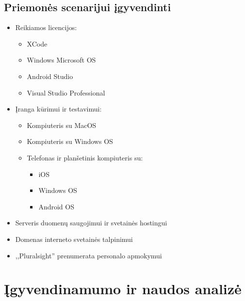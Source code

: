\documentclass{VUMIFPSkursinis}
\begin{document}
    \subsection{Priemonės scenarijui įgyvendinti} \label{sistemosNaudojimoScenarijus_esamaBukle_priemonesScenarijuiIgyvendinti}
      \begin{itemize}
        \item Reikiamos licencijos:
          \begin{itemize}
            \item XCode
            \item Windows Microsoft OS
            \item Android Studio
            \item Visual Studio Professional
          \end{itemize}
        \item Įranga kūrimui ir testavimui:
          \begin{itemize}
            \item Kompiuteris su MacOS
            \item Kompiuteris su Windows OS
            \item Telefonas ir planšetinis kompiuteris su:
              \begin{itemize}
                \item iOS
                \item Windows OS
                \item Android OS
              \end{itemize}
          \end{itemize}
        \item Serveris duomenų saugojimui ir svetainės hostingui  %
        \item Domenas interneto svetainės talpinimui
        \item ,,Pluralsight'' prenumerata personalo apmokymui
      \end{itemize}

\section{Įgyvendinamumo ir naudos analizė} \label{igyvendinamumoIrNaudosAnalize}
  \renewcommand{\tabularxcolumn}[1]{m{#1}}
\end{document}
